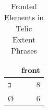 \begin{table}[htbp!]
\centering
\caption{Fronted Elements in Telic Extent Phrases}
\label{table:telic_front}
\begin{tabular}{lr}
\toprule
{} &  front \\
\midrule
\texthebrew{ב} &      8 \\
Ø              &      6 \\
\bottomrule
\end{tabular}
\end{table}
